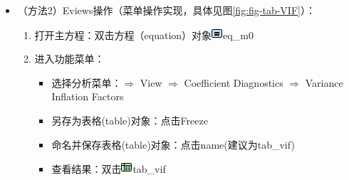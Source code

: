 \documentclass[12pt,(landscape,a4paper),(portrait,a4paper)]{article}
\providecommand{\tightlist}{%
  \setlength{\itemsep}{0pt}\setlength{\parskip}{0pt}}
\begin{document}
\begin{itemize}
\tightlist
\item
  （方法2）Eviews操作（菜单操作实现，具体见图\ref{fig:fig-tab-VIF}）：

  \begin{enumerate}
  \def\labelenumi{\arabic{enumi})}
  \tightlist
  \item
    打开主方程：双击方程（equation）对象\includegraphics{picture/object/Equation.png}eq\_m0\\
  \item
    进入功能菜单：

    \begin{itemize}
    \tightlist
    \item
      选择分析菜单：\(\Rightarrow\) View \(\Rightarrow\) Coefficient
      Diagnostics \(\Rightarrow\) Variance Inflation Factors
    \item
      另存为表格(table)对象：点击Freeze
    \item
      命名并保存表格(table)对象：点击name(建议为tab\_vif)
    \item
      查看结果：双击\includegraphics{picture/object/Table.png}tab\_vif
    \end{itemize}
  \end{enumerate}
\end{itemize}
\end{document}
